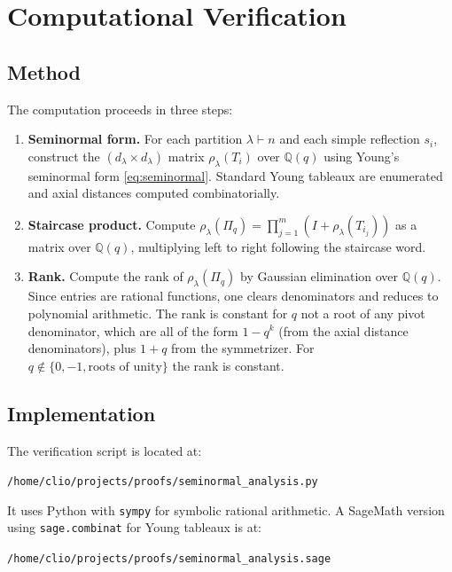 \documentclass[12pt]{article}
\theoremstyle{remark}
\theoremstyle{definition}
\begin{document}
\section{Computational Verification}
\label{sec:computation}

\subsection{Method}

The computation proceeds in three steps:

\begin{enumerate}
\item \textbf{Seminormal form.}  For each partition $\lambda \vdash n$ and each simple
  reflection $s_i$, construct the $(d_\lambda \times d_\lambda)$ matrix $\rho_\lambda(T_i)$
  over $\mathbb{Q}(q)$ using Young's seminormal form \eqref{eq:seminormal}.  Standard Young
  tableaux are enumerated and axial distances computed combinatorially.

\item \textbf{Staircase product.}  Compute $\rho_\lambda(\Pi_q) = \prod_{j=1}^{m}
  (I + \rho_\lambda(T_{i_j}))$ as a matrix over $\mathbb{Q}(q)$, multiplying left to right
  following the staircase word.

\item \textbf{Rank.}  Compute the rank of $\rho_\lambda(\Pi_q)$ by Gaussian elimination over
  $\mathbb{Q}(q)$.  Since entries are rational functions, one clears denominators and reduces
  to polynomial arithmetic.  The rank is constant for $q$ not a root of any pivot denominator,
  which are all of the form $1 - q^k$ (from the axial distance denominators), plus $1 + q$
  from the symmetrizer.  For $q \notin \{0, -1, \text{roots of unity}\}$ the rank is
  constant.
\end{enumerate}

\subsection{Implementation}

The verification script is located at:
\begin{center}
\texttt{/home/clio/projects/proofs/seminormal\_analysis.py}
\end{center}
It uses Python with \texttt{sympy} for symbolic rational arithmetic.  A SageMath version
using \texttt{sage.combinat} for Young tableaux is at:
\begin{center}
\texttt{/home/clio/projects/proofs/seminormal\_analysis.sage}
\end{center}
\end{document}
